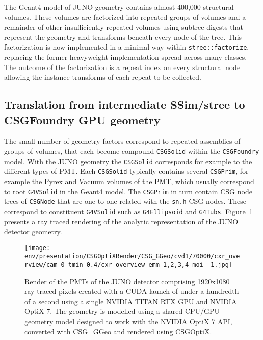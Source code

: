 \documentclass{webofc}
\begin{document}
The Geant4 model of JUNO geometry contains almost 400,000 structural volumes.
These volumes are factorized into repeated groups of volumes and a remainder of 
other insufficiently repeated volumes using subtree digests that represent the geometry and transforms 
beneath every node of the tree. This factorization is now implemented in a minimal way 
within {\tt stree::factorize}, replacing the former heavyweight implementation spread across many classes. 
The outcome of the factorization is a repeat index on every structural node allowing 
the instance transforms of each repeat to be collected. 

%
\subsection{Translation from intermediate SSim/stree to CSGFoundry GPU geometry}%
%
The small number of geometry factors correspond to repeated assemblies of groups of volumes, 
that each become compound {\tt CSGSolid} within the {\tt CSGFoundry} model.  
With the JUNO geometry the {\tt CSGSolid} corresponds for example to the different types of PMT.
Each {\tt CSGSolid} typically contains several {\tt CSGPrim}, for example the Pyrex and Vacuum volumes of the PMT, 
which usually correspond to root {\tt G4VSolid} in the Geant4 model. 
The {\tt CSGPrim} in turn contain CSG node trees of {\tt CSGNode} that are one to one related with the {\tt sn.h} CSG nodes. 
These correspond to constituent {\tt G4VSolid} such as {\tt G4Ellipsoid} and {\tt G4Tubs}. 
Figure~\ref{j1808} presents a ray traced rendering of the analytic representation of the JUNO detector geometry. 

%
%
\begin{figure}
\centering
\texttt{[image: env/presentation/CSGOptiXRender/CSG\_GGeo/cvd1/70000/cxr\_overview/cam\_0\_tmin\_0.4/cxr\_overview\_emm\_1,2,3,4\_moi\_-1.jpg]}
\caption{Render of the PMTs of the JUNO detector comprising 1920x1080 ray traced pixels created with a CUDA launch of under a hundredth of a second  
using a single NVIDIA TITAN RTX GPU and NVIDIA OptiX 7.
The geometry is modelled using a shared CPU/GPU geometry model\cite{csgfoundry} 
designed to work with the NVIDIA OptiX 7 API, converted with CSG\_GGeo\cite{csgggeo} and rendered using CSGOptiX\cite{csgoptix}.
\label{j1808}}
\end{figure}
%
%
\end{document}
